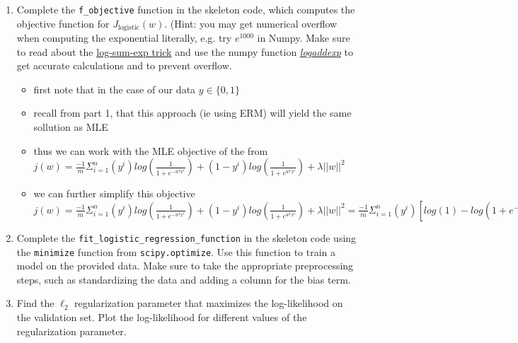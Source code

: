 \documentclass{article}
\theoremstyle{plain}
\theoremstyle{definition}
\begin{document}
\begin{enumerate}
\item Complete the \texttt{f\_objective} function in the skeleton code,
which computes the objective function for $J_{\text{logistic}}(w)$.
(Hint: you may get numerical overflow when computing the exponential literally,
e.g. try $e^{1000}$ in Numpy.
Make sure to read about the
\href{https://blog.feedly.com/tricks-of-the-trade-logsumexp/}{log-sum-exp trick}
and use the numpy function
\textit{ \href{https://docs.scipy.org/doc/numpy/reference/generated/numpy.logaddexp.html}{logaddexp}
}
to get accurate calculations
and to prevent overflow.

\begin{itemize}
    \color{blue}
    \item first note that in the case of our data $y\in \{0,1\}$
    \item recall from part 1, that this approach (ie using ERM) will yield the same sollution as MLE 
    \item thus we can work with the MLE objective of the from $j(w)=\frac{-1}{m}\Sigma_{i=1}^{n}(y^i)log(\frac{1}{1+e^{-w^tx^i}})+(1-y^i)log(\frac{1}{1+e^{w^tx^i}})+\lambda ||w||^2$
    \item we can further simplify this objective$j(w)=\frac{-1}{m}\Sigma_{i=1}^{n}(y^i)log(\frac{1}{1+e^{-w^tx^i}})+(1-y^i)log(\frac{1}{1+e^{w^tx^i}})+\lambda ||w||^2=\frac{-1}{m}\Sigma_{i=1}^{n}(y^i)[log({1})-log({1+e^{-w^tx^i}})]+(1-y^i)[log(1)-log({1+e^{w^tx^i}}))+\lambda ||w||^2=\Sigma_{i=1}^{n}\lambda ||w||^2-(y^i)[log({1+e^{-w^tx^i}})]-(1-y^i)[log({1+e^{w^tx^i}})])=\Sigma_{i=1}^{n}\lambda ||w||^2-(y^i)[log({e^{0}+e^{-w^tx^i}})]-(1-y^i)[log({e^{0}+e^{w^tx^i}})])=\frac{-1}{n}\Sigma_{i=1}^{n}\lambda||w||^2-log(e^0+e^{-y^nw^tx^n})-log(e^0+e^{y^nw^tx^n})$
\end{itemize}

\item Complete the \texttt{fit\_logistic\_regression\_function} in the skeleton
code using the \texttt{minimize} function from \texttt{scipy.optimize}.
Use this function to train
a model on the provided data. Make sure to take the appropriate preprocessing
steps, such as standardizing the data and adding a column for the
bias term. 

\item Find the $\ell_{2}$ regularization parameter that maximizes the log-likelihood
on the validation set. Plot the log-likelihood for different values
of the regularization parameter. 


\end{enumerate}
\end{document}
